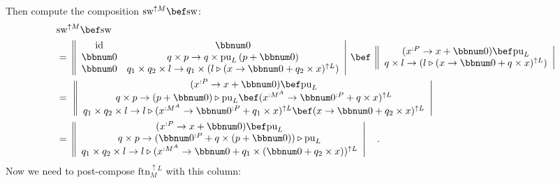 Then compute the composition $\text{sw}^{\uparrow M}\bef\text{sw}$:
\begin{align*}
 & \text{sw}^{\uparrow M}\bef\text{sw}\\
 & =\,\left\Vert \begin{array}{cc}
\text{id} & \bbnum 0\\
\bbnum 0 & q\times p\rightarrow q\times\text{pu}_{L}\left(p+\bbnum 0\right)\\
\bbnum 0 & q_{1}\times q_{2}\times l\rightarrow q_{1}\times(l\triangleright(x\rightarrow\bbnum 0+q_{2}\times x)^{\uparrow L})
\end{array}\right|\,\bef\,\left\Vert \begin{array}{c}
(x^{:P}\rightarrow x+\bbnum 0)\bef\text{pu}_{L}\\
q\times l\rightarrow(l\triangleright(x\rightarrow\bbnum 0+q\times x)^{\uparrow L})
\end{array}\right|\\
 & =\,\,\left\Vert \begin{array}{c}
(x^{:P}\rightarrow x+\bbnum 0)\bef\text{pu}_{L}\\
q\times p\rightarrow\left(p+\bbnum 0\right)\triangleright\text{pu}_{L}\bef(x^{:M^{A}}\rightarrow\bbnum 0^{:P}+q\times x)^{\uparrow L}\\
q_{1}\times q_{2}\times l\rightarrow l\triangleright(x^{:M^{A}}\rightarrow\bbnum 0^{:P}+q_{1}\times x)^{\uparrow L}\bef(x\rightarrow\bbnum 0+q_{2}\times x)^{\uparrow L}
\end{array}\right|\\
 & =\,\left\Vert \begin{array}{c}
(x^{:P}\rightarrow x+\bbnum 0)\bef\text{pu}_{L}\\
q\times p\rightarrow(\bbnum 0^{:P}+q\times\left(p+\bbnum 0\right))\triangleright\text{pu}_{L}\\
q_{1}\times q_{2}\times l\rightarrow l\triangleright(x^{:M^{A}}\rightarrow\bbnum 0+q_{1}\times(\bbnum 0+q_{2}\times x))^{\uparrow L}
\end{array}\right|\quad.
\end{align*}
Now we need to post-compose $\text{ftn}_{M}^{\uparrow L}$ with this
column:
